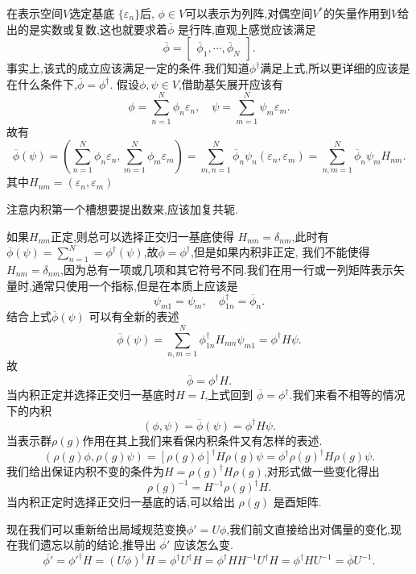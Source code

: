 \documentclass[../main.tex]{subfiles}
\begin{document}
 在表示空间$V$选定基底 $\{\varepsilon_n\}$后, $\phi \in V$可以表示为列阵,对偶空间$V^*$的矢量作用到$V$给出的是实数或复数,这也就要求着$\overline{\phi}$ 是行阵,直观上感觉应该满足\[
 \overline{\phi} = \begin{bmatrix} \overline{\phi}_1, \cdots, \overline{\phi}_N \end{bmatrix} 
 .\]事实上,该式的成立应该满足一定的条件.我们知道$\phi^\dagger $满足上式,所以更详细的应该是在什么条件下,$\overline{\phi} = \phi^\dagger $.
 假设$\phi,\psi \in V$,借助基矢展开应该有\[
 \phi = \sum^N_{n=1} \phi_n \varepsilon_n,\quad \psi = \sum^N_{m = 1} \psi_m \varepsilon_m
 .\] 
 故有\[
 \overline{\phi}(\psi) = (\sum^N_{n = 1} \phi_n \varepsilon_n, \sum^N_{m = 1} \phi_m \varepsilon_m) = \sum^N_{m,n = 1} \overline{\phi}_n \psi_n(\varepsilon_n,\varepsilon_m) = \sum^N_{n,m = 1} \overline{\phi}_n \psi_m H_{nm}
 .\] 
 其中$H_{nm}= (\varepsilon_n,\varepsilon_m)$
 \begin{note}
注意内积第一个槽想要提出数来,应该加复共轭. 
 \end{note}
 如果$H_{nm}$正定,则总可以选择正交归一基底使得 $H_{nm} = \delta_{nm}$,此时有$\overline{\phi}(\psi) = \sum^N_{n = 1} = \phi^\dagger (\psi)$,故$\overline{\phi} = \phi^\dagger $,但是如果内积非正定,
 我们不能使得$H_{nm} = \delta_{nm}$,因为总有一项或几项和其它符号不同.我们在用一行或一列矩阵表示矢量时,通常只使用一个指标,但是在本质上应该是 \[
 \psi_{m 1} = \psi_{m}, \quad \phi^\dagger_{1n} = \overline{\phi}_n
 .\] 
 结合上式$\overline{\phi}(\psi)$ 可以有全新的表述\[
 \overline{\phi}(\psi) = \sum^N_{n,m = 1} \phi^\dagger _{1n} H_{nm}\psi_{m1} = \phi^\dagger H \psi 
 .\] 
 故 \[
 \overline{\phi} = \phi^\dagger H 
 .\] 
 当内积正定并选择正交归一基底时$H = I$,上式回到 $\overline{\phi} = \phi^\dagger $.我们来看不相等的情况下的内积\[
 (\phi,\psi) = \overline{\phi}(\psi) = \phi^\dagger H \psi 
 .\] 
 当表示群$\rho(g)$作用在其上我们来看保内积条件又有怎样的表述.
\[
  (\rho(g)\phi,\rho(g)\psi) = [\rho(g)\phi]^\dagger H \rho(g)\psi =  \phi^\dagger \rho(g)^\dagger  H \rho(g) \psi 
 .\] 
 我们给出保证内积不变的条件为$H = \rho(g) ^\dagger H \rho(g)$,对形式做一些变化得出\[
 \rho(g)^{-1} = H^{-1} \rho(g)^\dagger H 
 .\] 
 当内积正定时选择正交归一基底的话,可以给出 $\rho(g)$ 是酉矩阵.

 现在我们可以重新给出局域规范变换$\phi' = U\phi$,我们前文直接给出对偶量的变化,现在我们遗忘以前的结论,推导出 $\overline{\phi'}$ 应该怎么变.
 \[
 \overline{\phi'} = \phi'^\dagger H = (U \phi)^\dagger H = \phi^\dagger U^\dagger H = \phi^\dagger H H^{-1} U^\dagger H = \phi^\dagger H U^{-1} = \overline{\phi} U^{-1} 
 .\] 
\end{document}
